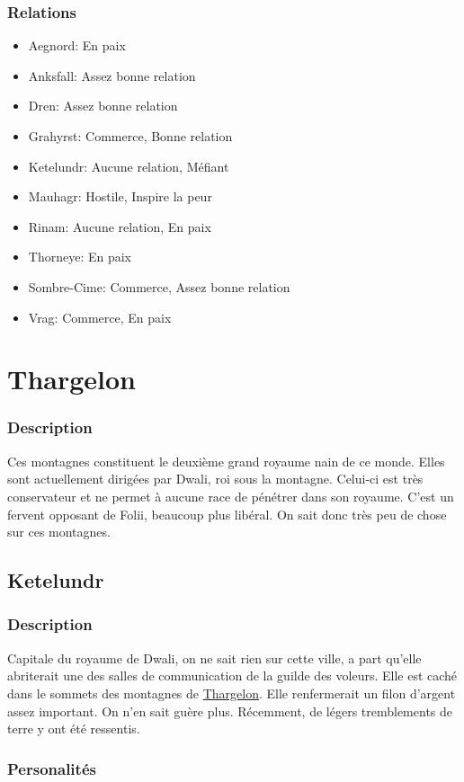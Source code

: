 \subsubsection{Relations}
\begin{itemize}
\item Aegnord: En paix 
\item Anksfall: Assez bonne relation 
\item Dren: Assez bonne relation    
\item Grahyrst: Commerce, Bonne relation 
\item Ketelundr: Aucune relation, Méfiant 
\item Mauhagr: Hostile, Inspire la peur  
\item Rinam: Aucune relation, En paix 
\item Thorneye: En paix 
\item Sombre-Cime: Commerce, Assez bonne relation  
\item Vrag: Commerce, En paix 
\end{itemize}
\section{Thargelon}
\subsubsection{Description}
\hypertarget {thargelon}{}Ces montagnes constituent le deuxième grand royaume nain de ce monde. 
Elles sont actuellement dirigées par Dwali, roi sous la montagne.
Celui-ci est très conservateur et ne permet à aucune race de pénétrer dans son royaume.
C'est un fervent opposant de Folii, beaucoup plus libéral. 
On sait donc très peu de chose sur ces montagnes.
\subsection{Ketelundr}
\subsubsection{Description}
\hypertarget {ketelundr}{}Capitale du royaume de Dwali, on ne sait rien sur cette ville,
a part qu'elle abriterait une des salles de communication de la guilde des voleurs.
Elle est caché dans le sommets des montagnes de \hyperlink {thargelon}{Thargelon}.
Elle renfermerait un filon d'argent assez important. On n'en sait guère plus.
Récemment, de légers tremblements de terre y ont été ressentis.
\subsubsection{Personalités}

